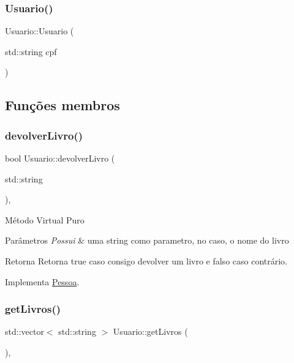 \subsubsection{\texorpdfstring{Usuario()}{Usuario()}}
{\footnotesize\ttfamily Usuario\+::\+Usuario (\begin{DoxyParamCaption}\item[{std\+::string}]{cpf }\end{DoxyParamCaption})}



\subsection{Funções membros}
\mbox{\label{class_usuario_ad1fe8d76ca93b5505e72b1b6d50acca5}} 
\subsubsection{\texorpdfstring{devolverLivro()}{devolverLivro()}}
{\footnotesize\ttfamily bool Usuario\+::devolver\+Livro (\begin{DoxyParamCaption}\item[{std\+::string}]{ }\end{DoxyParamCaption})\hspace{0.3cm}{\ttfamily [override]}, {\ttfamily [virtual]}}

Método Virtual Puro 
\begin{DoxyParams}{Parâmetros}
{\em Possui} & uma string como parametro, no caso, o nome do livro \\
\hline
\end{DoxyParams}
\begin{DoxyReturn}{Retorna}
Retorna true caso consigo devolver um livro e falso caso contrário. 
\end{DoxyReturn}


Implementa \mbox{\hyperlink{class_pessoa_a92f80c6215d5c79ce1e2915df3a34a5b}{Pessoa}}.

\mbox{\label{class_usuario_ace50554a36f9deb7387bb2146295dedb}} 
\subsubsection{\texorpdfstring{getLivros()}{getLivros()}}
{\footnotesize\ttfamily std\+::vector$<$ std\+::string $>$ Usuario\+::get\+Livros (\begin{DoxyParamCaption}{ }\end{DoxyParamCaption})\hspace{0.3cm}{\ttfamily [override]}, {\ttfamily [virtual]}}

